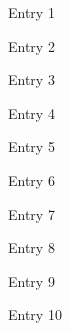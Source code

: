 
\begin{thebibliography}{88} %

  Entry 1

  Entry 2

  Entry 3

  Entry 4

  Entry 5

  Entry 6

  Entry 7

  Entry 8

  Entry 9

  Entry 10

\end{thebibliography}
